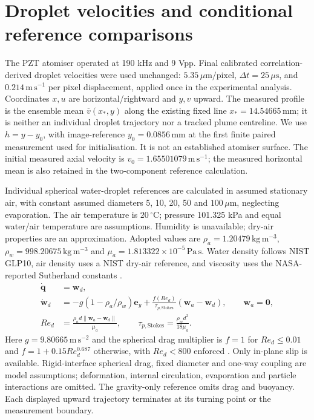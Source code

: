 \section{Droplet velocities and conditional reference comparisons}
The PZT atomiser operated at 190 kHz and 9 Vpp. Final calibrated correlation-derived
droplet velocities were used unchanged: $5.35\,\mu\mathrm{m/pixel}$,
$\Delta t=25\,\mu\mathrm{s}$, and $0.214\,\mathrm{m\,s^{-1}}$ per pixel
displacement, applied once in the experimental analysis. Coordinates $x,u$ are
horizontal/rightward and $y,v$ upward. The measured profile is the ensemble mean
$\overline{v}(x_*,y)$ along the existing fixed line $x_*=14.54665\,\mathrm{mm}$;
it is neither an individual droplet trajectory nor a tracked plume centreline.
We use $h=y-y_0$, with image-reference $y_0=0.0856\,\mathrm{mm}$
at the first finite paired measurement used for initialisation. It is not an
established atomiser surface. The initial measured axial velocity is
$v_0=1.65501079\,\mathrm{m\,s^{-1}}$; the measured horizontal
mean is also retained in the two-component reference calculation.

Individual spherical water-droplet references are calculated in assumed stationary
air, with constant assumed diameters 5, 10, 20, 50 and $100\,\mu\mathrm{m}$,
neglecting evaporation. The air temperature is $20\,^{\circ}\mathrm{C}$;
pressure 101.325 kPa and equal water/air temperature are assumptions. Humidity is
unavailable; dry-air properties are an approximation. Adopted values are
$\rho_a=1.20479\,\mathrm{kg\,m^{-3}}$,
$\rho_w=998.20675\,\mathrm{kg\,m^{-3}}$ and
$\mu_a=1.813322\times10^{-5}\,\mathrm{Pa\,s}$.
Water density follows NIST GLP10, air density uses a NIST dry-air reference,
and viscosity uses the NASA-reported Sutherland constants
\cite{pzt-water,pzt-air,pzt-viscosity}.
\begin{align}
\dot{\boldsymbol q}&=\boldsymbol w_d,\\
\dot{\boldsymbol w}_d&=-g(1-\rho_a/\rho_w)\boldsymbol e_y
+\frac{f(Re_d)}{\tau_{p,\mathrm{Stokes}}}
(\boldsymbol w_a-\boldsymbol w_d),\qquad \boldsymbol w_a=\boldsymbol 0,\\
Re_d&=\frac{\rho_a d\lVert\boldsymbol w_a-\boldsymbol w_d\rVert}{\mu_a},
\qquad\tau_{p,\mathrm{Stokes}}=\frac{\rho_w d^2}{18\mu_a}.
\end{align}
Here $g=9.80665\,\mathrm{m\,s^{-2}}$ and the spherical drag multiplier is
$f=1$ for $Re_d\leq0.01$ and $f=1+0.15Re_d^{0.687}$ otherwise, with
$Re_d<800$ enforced \cite{pzt-drag}. Only in-plane slip is available. Rigid-interface spherical
drag, fixed diameter and one-way coupling are model assumptions; deformation,
internal circulation, evaporation and particle interactions are omitted.
The gravity-only reference omits drag and buoyancy. Each displayed upward
trajectory terminates at its turning point or the measurement boundary.

